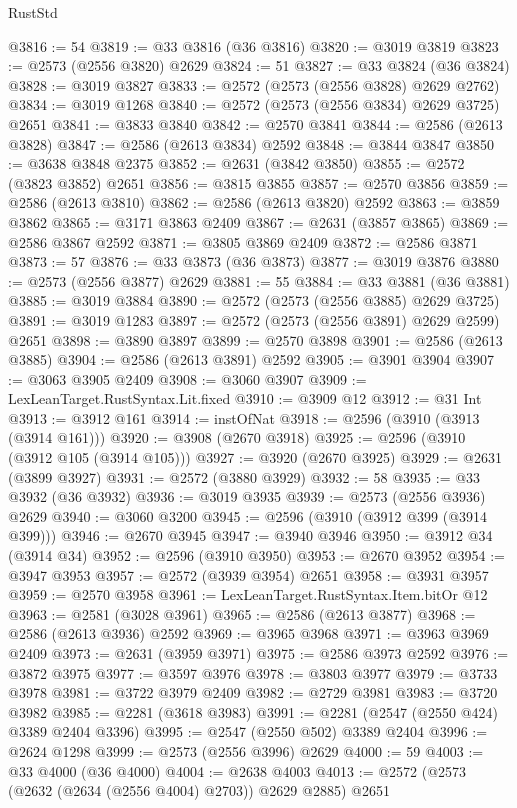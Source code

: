 \begin{lexlean}{RustStd}
\begin{coremodule}
@3816 := 54
@3819 := @33 @3816 (@36 @3816)
@3820 := @3019 @3819
@3823 := @2573 (@2556 @3820) @2629
@3824 := 51
@3827 := @33 @3824 (@36 @3824)
@3828 := @3019 @3827
@3833 := @2572 (@2573 (@2556 @3828) @2629 @2762)
@3834 := @3019 @1268
@3840 := @2572 (@2573 (@2556 @3834) @2629 @3725) @2651
@3841 := @3833 @3840
@3842 := @2570 @3841
@3844 := @2586 (@2613 @3828)
@3847 := @2586 (@2613 @3834) @2592
@3848 := @3844 @3847
@3850 := @3638 @3848 @2375
@3852 := @2631 (@3842 @3850)
@3855 := @2572 (@3823 @3852) @2651
@3856 := @3815 @3855
@3857 := @2570 @3856
@3859 := @2586 (@2613 @3810)
@3862 := @2586 (@2613 @3820) @2592
@3863 := @3859 @3862
@3865 := @3171 @3863 @2409
@3867 := @2631 (@3857 @3865)
@3869 := @2586 @3867 @2592
@3871 := @3805 @3869 @2409
@3872 := @2586 @3871
@3873 := 57
@3876 := @33 @3873 (@36 @3873)
@3877 := @3019 @3876
@3880 := @2573 (@2556 @3877) @2629
@3881 := 55
@3884 := @33 @3881 (@36 @3881)
@3885 := @3019 @3884
@3890 := @2572 (@2573 (@2556 @3885) @2629 @3725)
@3891 := @3019 @1283
@3897 := @2572 (@2573 (@2556 @3891) @2629 @2599) @2651
@3898 := @3890 @3897
@3899 := @2570 @3898
@3901 := @2586 (@2613 @3885)
@3904 := @2586 (@2613 @3891) @2592
@3905 := @3901 @3904
@3907 := @3063 @3905 @2409
@3908 := @3060 @3907
@3909 := LexLeanTarget.RustSyntax.Lit.fixed
@3910 := @3909 @12
@3912 := @31 Int
@3913 := @3912 @161
@3914 := instOfNat
@3918 := @2596 (@3910 (@3913 (@3914 @161)))
@3920 := @3908 (@2670 @3918)
@3925 := @2596 (@3910 (@3912 @105 (@3914 @105)))
@3927 := @3920 (@2670 @3925)
@3929 := @2631 (@3899 @3927)
@3931 := @2572 (@3880 @3929)
@3932 := 58
@3935 := @33 @3932 (@36 @3932)
@3936 := @3019 @3935
@3939 := @2573 (@2556 @3936) @2629
@3940 := @3060 @3200
@3945 := @2596 (@3910 (@3912 @399 (@3914 @399)))
@3946 := @2670 @3945
@3947 := @3940 @3946
@3950 := @3912 @34 (@3914 @34)
@3952 := @2596 (@3910 @3950)
@3953 := @2670 @3952
@3954 := @3947 @3953
@3957 := @2572 (@3939 @3954) @2651
@3958 := @3931 @3957
@3959 := @2570 @3958
@3961 := LexLeanTarget.RustSyntax.Item.bitOr @12
@3963 := @2581 (@3028 @3961)
@3965 := @2586 (@2613 @3877)
@3968 := @2586 (@2613 @3936) @2592
@3969 := @3965 @3968
@3971 := @3963 @3969 @2409
@3973 := @2631 (@3959 @3971)
@3975 := @2586 @3973 @2592
@3976 := @3872 @3975
@3977 := @3597 @3976
@3978 := @3803 @3977
@3979 := @3733 @3978
@3981 := @3722 @3979 @2409
@3982 := @2729 @3981
@3983 := @3720 @3982
@3985 := @2281 (@3618 @3983)
@3991 := @2281 (@2547 (@2550 @424) @3389 @2404 @3396)
@3995 := @2547 (@2550 @502) @3389 @2404
@3996 := @2624 @1298
@3999 := @2573 (@2556 @3996) @2629
@4000 := 59
@4003 := @33 @4000 (@36 @4000)
@4004 := @2638 @4003
@4013 := @2572 (@2573 (@2632 (@2634 (@2556 @4004) @2703)) @2629 @2885) @2651

\end{coremodule}
\end{lexlean}
